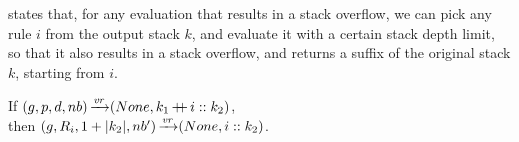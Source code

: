 



 states that,
for any evaluation that results in a stack overflow,
we can pick any rule $i$ from the output stack $k$,
and evaluate it with a certain stack depth limit,
so that it also results in a stack overflow,
and returns a suffix of the original stack $k$,
starting from $i$.

\begin{lemma}%
    If $(g,p,d,nb) \operatorname{\xrightarrow{\mathit{vr}}} (None,k_1 \operatorname{+\kern -0.4em+} i :: k_2)$, \\
    then $(g,R_{i},1+|k_2|,nb') \operatorname{\xrightarrow{\mathit{vr}}} (None,i :: k_2)$.
    \label{lemma:ff-for-lr-patterns}
\end{lemma}

